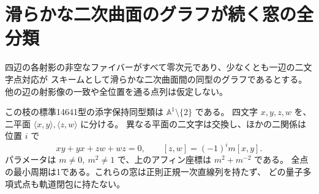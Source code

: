 \section{滑らかな二次曲面のグラフが続く窓の全分類}
\label{sec:smooth-quadric-graphs}
四辺の各射影の非空なファイバーがすべて零次元であり、少なくとも一辺の二文字点対応が
スキームとして滑らかな二次曲面間の同型のグラフであるとする。
他の辺の射影像の一致や全位置を通る点列は仮定しない。
\begin{theorem}\label{thm:smooth-quadric-graphs}
この枝の標準14641型の添字保持同型類は $\mathbb A^1\setminus\{2\}$ である。
四文字 $x,y,z,w$ を、二平面 $\langle x,y\rangle,\langle z,w\rangle$ に分ける。
異なる平面の二文字は交換し、ほかの二関係は位置 $i$ で
\[
 xy+yx+zw+wz=0,\qquad [z,w]=(-1)^i m[x,y].
\]
パラメータは $m\ne0,\ m^2\ne1$ で、上のアフィン座標は $m^2+m^{-2}$ である。
全点の最小周期は1である。これらの窓は正則正規一次直線列を持たず、
どの量子多項式点も軌道閉包に持たない。
\end{theorem}
